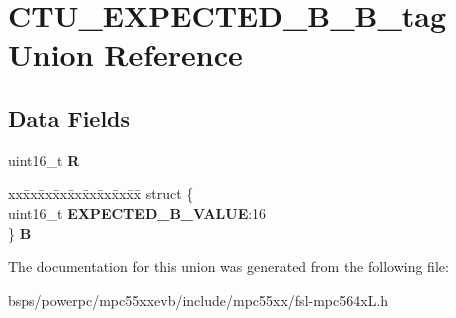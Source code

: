 \hypertarget{unionCTU__EXPECTED__B__16B__tag}{}\section{C\+T\+U\+\_\+\+E\+X\+P\+E\+C\+T\+E\+D\+\_\+\+B\+\_\+B\+\_\+tag Union Reference}
\label{unionCTU__EXPECTED__B__16B__tag}
\subsection*{Data Fields}
\begin{DoxyCompactItemize}
\item 
\mbox{\label{unionCTU__EXPECTED__B__16B__tag_a5930aa0fd925f5cfe73efcbedcf0af55}} 
uint16\+\_\+t {\bfseries R}
\item 
\mbox{\label{unionCTU__EXPECTED__B__16B__tag_a05f43e7ab72314965469c7f0ae21c712}} 
\begin{tabbing}
xx\=xx\=xx\=xx\=xx\=xx\=xx\=xx\=xx\=\kill
struct \{\\
\>uint16\_t {\bfseries EXPECTED\_B\_VALUE}:16\\
\} {\bfseries B}\\

\end{tabbing}\end{DoxyCompactItemize}


The documentation for this union was generated from the following file\+:\begin{DoxyCompactItemize}
\item 
bsps/powerpc/mpc55xxevb/include/mpc55xx/fsl-\/mpc564x\+L.\+h\end{DoxyCompactItemize}
